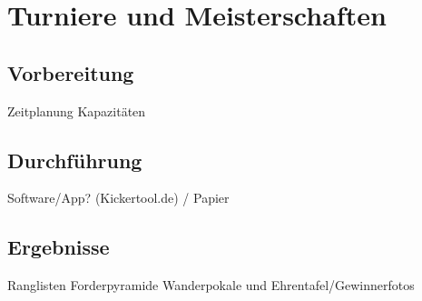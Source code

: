 \chapter{Turniere und Meisterschaften}

\section{Vorbereitung}
Zeitplanung
Kapazitäten

\section{Durchführung}
Software/App? (Kickertool.de) / Papier

\section{Ergebnisse}
Ranglisten
Forderpyramide
Wanderpokale und Ehrentafel/Gewinnerfotos

